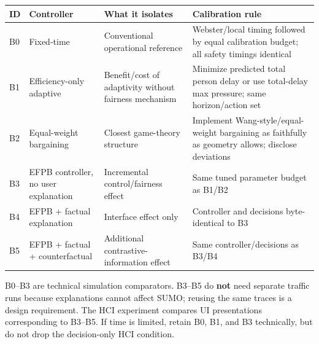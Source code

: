 \documentclass[
  english,
  11pt,
  a4paper,
]{article}
\newcounter{none} %
\begin{document}
{\def\LTcaptype{none} %
\begin{longtable}[]{@{}
  >{\raggedright\arraybackslash}p{}
  >{\raggedright\arraybackslash}p{}
  >{\raggedright\arraybackslash}p{}
  >{\raggedright\arraybackslash}p{}@{}}
\toprule\noalign{}
\begin{minipage}[b]{\linewidth}\raggedright
ID
\end{minipage} & \begin{minipage}[b]{\linewidth}\raggedright
Controller
\end{minipage} & \begin{minipage}[b]{\linewidth}\raggedright
What it isolates
\end{minipage} & \begin{minipage}[b]{\linewidth}\raggedright
Calibration rule
\end{minipage} \\
\midrule\noalign{}
\endhead
\bottomrule\noalign{}
\endlastfoot
B0 & Fixed-time & Conventional operational reference & Webster/local
timing followed by equal calibration budget; all safety timings
identical \\
B1 & Efficiency-only adaptive & Benefit/cost of adaptivity without
fairness mechanism & Minimize predicted total person delay or use
total-delay max pressure; same horizon/action set \\
B2 & Equal-weight bargaining & Closest game-theory structure & Implement
Wang-style/equal-weight bargaining as faithfully as geometry allows;
disclose deviations \\
B3 & EFPB controller, no user explanation & Incremental control/fairness
effect & Same tuned parameter budget as B1/B2 \\
B4 & EFPB + factual explanation & Interface effect only & Controller and
decisions byte-identical to B3 \\
B5 & EFPB + factual + counterfactual & Additional
contrastive-information effect & Same controller/decisions as B3/B4 \\
\end{longtable}
}

B0--B3 are technical simulation comparators. B3--B5 do \textbf{not} need
separate traffic runs because explanations cannot affect SUMO; reusing
the same traces is a design requirement. The HCI experiment compares UI
presentations corresponding to B3--B5. If time is limited, retain B0,
B1, and B3 technically, but do not drop the decision-only HCI condition.
\end{document}
